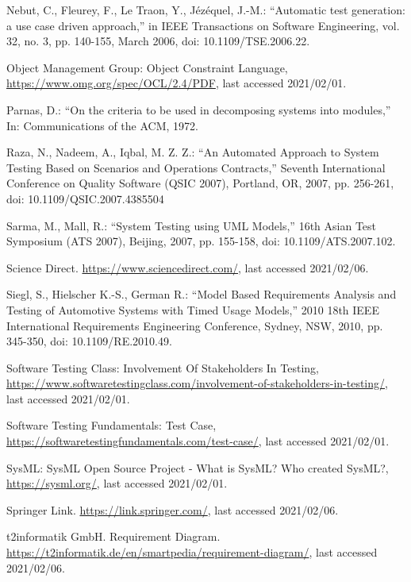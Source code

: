 \documentclass[a4paper,10pt, bibliography=totocnumbered]{scrreprt}
\begin{document}
\begin{thebibliography}{9}
 Nebut, C., Fleurey, F., Le Traon, Y., Jézéquel, J.-M.: \enquote{Automatic test generation: a use case driven approach,} in IEEE Transactions on Software Engineering, vol. 32, no. 3, pp. 140-155, March 2006, doi: 10.1109/TSE.2006.22.

 Object Management Group: Object Constraint Language, \url{https://www.omg.org/spec/OCL/2.4/PDF}, last accessed 2021/02/01.

 Parnas, D.: \enquote{On the criteria to be used in decomposing systems into modules,}
In: Communications of the ACM, 1972.

 Raza, N., Nadeem, A., Iqbal, M. Z. Z.: \enquote{An Automated Approach to System Testing Based on Scenarios and Operations Contracts,} Seventh International Conference on Quality Software (QSIC 2007), Portland, OR, 2007, pp. 256-261, doi: 10.1109/QSIC.2007.4385504

 Sarma, M., Mall, R.: \enquote{System Testing using UML Models,} 16th Asian Test Symposium (ATS 2007), Beijing, 2007, pp. 155-158, doi: 10.1109/ATS.2007.102.

 Science Direct. \url{https://www.sciencedirect.com/}, last accessed 2021/02/06.

 Siegl, S., Hielscher K.-S., German R.: \enquote{Model Based Requirements Analysis and Testing of Automotive Systems with Timed Usage Models,} 2010 18th IEEE International Requirements Engineering Conference, Sydney, NSW, 2010, pp. 345-350, doi: 10.1109/RE.2010.49.

 Software Testing Class: Involvement Of Stakeholders In Testing, \url{https://www.softwaretestingclass.com/involvement-of-stakeholders-in-testing/}, last accessed 2021/02/01.

 Software Testing Fundamentals: Test Case, \url{https://softwaretestingfundamentals.com/test-case/}, last accessed 2021/02/01.

 SysML: SysML Open Source Project - What is SysML? Who created SysML?, \url{https://sysml.org/}, last accessed 2021/02/01.

 Springer Link. \url{https://link.springer.com/}, last accessed 2021/02/06.

 t2informatik GmbH. Requirement Diagram.
\url{https://t2informatik.de/en/smartpedia/requirement-diagram/}, last accessed 2021/02/06. 


\end{thebibliography}
\end{document}
